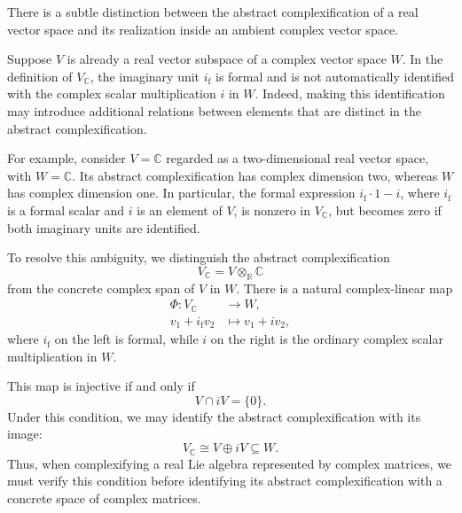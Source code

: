 \documentclass[../main.tex]{subfiles}
\begin{document}
\begin{remark}
  There is a subtle distinction between the abstract complexification of a real vector space and its realization inside an ambient complex vector space.

  Suppose $V$ is already a real vector subspace of a complex vector space $W$. In the definition of $V_{\mathbb{C}}$, the imaginary unit $i_{\mathrm{f}}$ is formal and is not automatically identified with the complex scalar multiplication $i$ in $W$. Indeed, making this identification may introduce additional relations between elements that are distinct in the abstract complexification.

  For example, consider $V=\mathbb{C}$ regarded as a two-dimensional real vector space, with $W=\mathbb{C}$. Its abstract complexification has complex dimension two, whereas $W$ has complex dimension one. In particular, the formal expression $i_{\mathrm{f}}\cdot 1-i$, where $i_{\mathrm{f}}$ is a formal scalar and $i$ is an element of $V$, is nonzero in $V_{\mathbb{C}}$, but becomes zero if both imaginary units are identified.

  To resolve this ambiguity, we distinguish the abstract complexification
  \begin{equation}
    V_{\mathbb{C}}=V\otimes_{\mathbb{R}}\mathbb{C}
  \end{equation}
  from the concrete complex span of $V$ in $W$. There is a natural complex-linear map
  \begin{equation}
    \begin{aligned}
      \Phi:V_{\mathbb{C}}&\longrightarrow W,\\
      v_1+i_{\mathrm{f}}v_2&\longmapsto v_1+iv_2,
    \end{aligned}
  \end{equation}
  where $i_{\mathrm{f}}$ on the left is formal, while $i$ on the right is the ordinary complex scalar multiplication in $W$.

  This map is injective if and only if
  \begin{equation}
    V\cap iV=\{0\}.
  \end{equation}
  Under this condition, we may identify the abstract complexification with its image:
  \begin{equation}
    V_{\mathbb{C}}\cong V\oplus iV\subseteq W.
  \end{equation}
  Thus, when complexifying a real Lie algebra represented by complex matrices, we must verify this condition before identifying its abstract complexification with a concrete space of complex matrices.


\end{remark}
\end{document}
